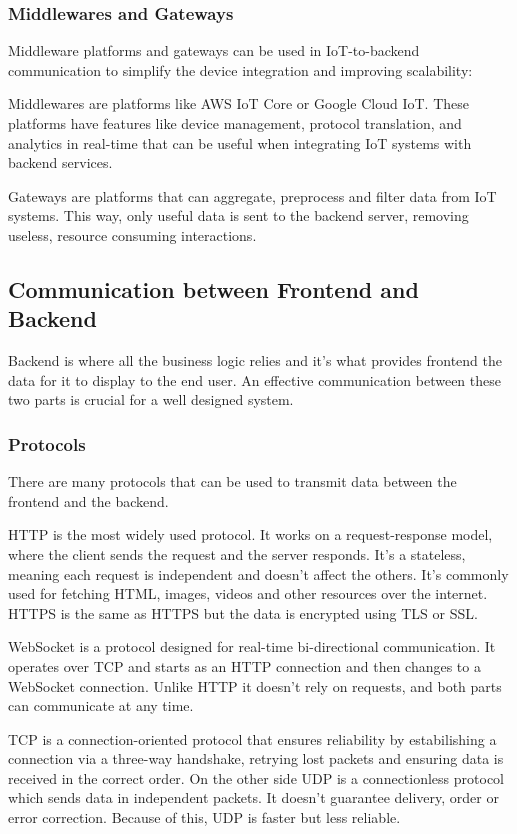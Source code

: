 \subsubsection{Middlewares and Gateways}
Middleware platforms and gateways can be used in \gls{IoT}-to-backend
communication to simplify the device integration and improving scalability:

Middlewares are platforms like \gls{AWS} \gls{IoT} Core or Google Cloud \gls{IoT}.
These platforms have features like device management, protocol translation, and
analytics in real-time that can be useful when integrating \gls{IoT} systems
with backend services.

Gateways are platforms that can aggregate, preprocess and filter data
from \gls{IoT} systems. This way, only useful data is sent to the backend server,
removing useless, resource consuming interactions.

\subsection{Communication between Frontend and Backend}
Backend is where all the business logic relies and it's what provides frontend
the data for it to display to the end user. An effective communication between
these two parts is crucial for a well designed system.
\subsubsection{Protocols}
There are many protocols that can be used to transmit data between the frontend
and the backend.

\gls{HTTP} is the most widely used protocol. It works on a
request-response model, where the client sends the request and the server
responds. It's a stateless, meaning each request is independent and doesn't
affect the others. It's commonly used for fetching \gls{HTML}, images, videos
and other resources over the internet. \gls{HTTPS} is the same as \gls{HTTPS} but the
data is encrypted using \gls{TLS} or \gls{SSL}.

WebSocket is a protocol designed for real-time bi-directional communication.
It operates over \gls{TCP} and starts as an \gls{HTTP} connection and then changes to a
WebSocket connection. Unlike \gls{HTTP} it doesn't rely on requests, and both
parts can communicate at any time.

\gls{TCP} is a connection-oriented protocol that ensures reliability by
estabilishing a connection via a three-way handshake, retrying lost
packets and ensuring data is received in the correct order.
On the other side \gls{UDP} is a connectionless protocol which sends data in
independent packets. It doesn't guarantee delivery, order or error
correction. Because of this, \gls{UDP} is faster but less reliable.

